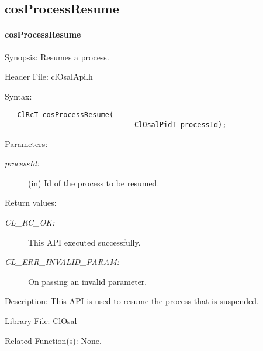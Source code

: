 \subsection{cosProcessResume}
\hypertarget{pageosal140}{}\paragraph{cos\-Process\-Resume}\label{pageosal140}
\begin{Desc}
\item[Synopsis:]Resumes a process.\end{Desc}
\begin{Desc}
\item[Header File:]clOsalApi.h\end{Desc}
\begin{Desc}
\item[Syntax:]

\footnotesize\begin{verbatim}   ClRcT cosProcessResume(
	                           ClOsalPidT processId);
\end{verbatim}
\normalsize
\end{Desc}
\begin{Desc}
\item[Parameters:]
\begin{description}
\item[{\em process\-Id:}](in) Id of the process to be resumed.
\end{description}
\end{Desc}
\begin{Desc}
\item[Return values:]
\begin{description}
\item[{\em CL\_\-RC\_\-OK:}]This API executed successfully. 
\item[{\em CL\_\-ERR\_\-INVALID\_\-PARAM:}]On passing an invalid parameter.

\end{description}
\end{Desc}
\begin{Desc}
\item[Description:]This API is used to resume the process that is suspended.\end{Desc}
\begin{Desc}
\item[Library File:]Cl\-Osal\end{Desc}
\begin{Desc}
\item[Related Function(s):]None.\end{Desc}


